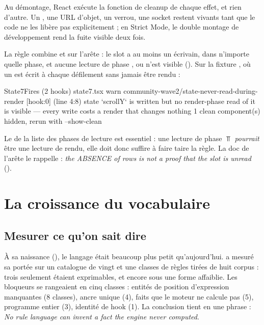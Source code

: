 \begin{react}
Au démontage, React exécute la fonction de cleanup de chaque effet, et rien d'autre. Un , une URL d'objet, un verrou, une socket restent vivants tant que le code ne les libère pas explicitement ; en Strict Mode, le double montage de développement rend la fuite visible deux fois.
\end{react}

La règle  combine  et  sur l'arête  : \og le slot a au moins un écrivain, dans n'importe quelle phase, et aucune lecture de phase ,  ou  n'est visible\fg{} (). Sur la fixture , où un  est écrit à chaque défilement sans jamais être rendu :
\begin{sortie}
  State7Fires  (2 hooks)  state7.tsx
    warn   community-wave2/state-never-read-during-render  [hook:0]  (line 4:8)  state `scrollY` is written but no render-phase read of it is visible — every write costs a render that changes nothing
   1 clean component(s) hidden, rerun with --show-clean
\end{sortie}
Le  de la liste des phases de lecture est essentiel : une lecture de phase $\Top$ \emph{pourrait} être une lecture de rendu, elle doit donc suffire à faire taire la règle. La doc de l'arête le rappelle : \og \emph{the ABSENCE of rows is not a proof that the slot is unread}\fg{} ().

\section{La croissance du vocabulaire}
\label{sec:regles-declaratives-vocabulaire}

\subsection{Mesurer ce qu'on sait dire}

À sa naissance (), le langage était beaucoup plus petit qu'aujourd'hui.  a mesuré sa portée sur un catalogue de vingt et une classes de règles tirées de huit corpus : trois seulement étaient exprimables, et encore sous une forme affaiblie. Les bloqueurs se rangeaient en cinq classes : entités de position d'expression manquantes (8 classes), ancre unique (4), faits que le moteur ne calcule pas (5), programme entier (3), identité de hook (1). La conclusion tient en une phrase : \og \emph{No rule language can invent a fact the engine never computed}\fg{}.

